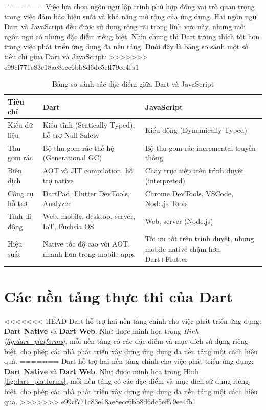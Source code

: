 \documentclass[../DoAn.tex]{subfiles}
\numberwithin{figure}{chapter}
\begin{document}
\begin{itemize}
\begin{itemize}
=======
Việc lựa chọn ngôn ngữ lập trình phù hợp đóng vai trò quan trọng trong việc đảm bảo hiệu suất và khả năng mở rộng của ứng dụng. Hai ngôn ngữ Dart và JavaScript đều được sử dụng rộng rãi trong lĩnh vực này, nhưng mỗi ngôn ngữ có những đặc điểm riêng biệt. Nhìn chung thì Dart tương thích tốt hơn trong việc phát triển ứng dụng đa nền tảng. Dưới đây là bảng so sánh một số tiêu chí giữa Dart và JavaScript:
>>>>>>> e99cf771c83e18ae8ecc6bb8d6dc5eff79ee4fb1
\begin{table}[H]
\centering
\begin{tabular}{|>{\centering\arraybackslash}p{4.5cm}|>{\centering\arraybackslash}p{4.5cm}|>{\centering\arraybackslash}p{4.5cm}|}
\hline
\textbf{Tiêu chí} & \textbf{Dart} & \textbf{JavaScript} \\ \hline
Kiểu dữ liệu & Kiểu tĩnh (Statically Typed), hỗ trợ Null Safety & Kiểu động (Dynamically Typed) \\ \hline
Thu gom rác & Bộ thu gom rác thế hệ (Generational GC) & Bộ thu gom rác incremental truyền thống \\ \hline
Biên dịch & AOT và JIT compilation, hỗ trợ native & Chạy trực tiếp trên trình duyệt (interpreted) \\ \hline
Công cụ hỗ trợ & DartPad, Flutter DevTools, Analyzer & Chrome DevTools, VSCode, Node.js Tools \\ \hline
Tính di động & Web, mobile, desktop, server, IoT, Fuchsia OS & Web, server (Node.js) \\ \hline
Hiệu suất & Native tốc độ cao với AOT, nhanh hơn trong mobile apps & Tối ưu tốt trên trình duyệt, nhưng mobile native chậm hơn Dart+Flutter \\ \hline
\end{tabular}
\caption{Bảng so sánh các đặc điểm giữa Dart và JavaScript}
\label{tab:dart_vs_js}
\end{table}

\section{Các nền tảng thực thi của Dart}

<<<<<<< HEAD
Dart hỗ trợ hai nền tảng chính cho việc phát triển ứng dụng: \textbf{Dart Native} và \textbf{Dart Web}. Như được minh họa trong \textit{Hình \ref{fig:dart_platforms}}, mỗi nền tảng có các đặc điểm và mục đích sử dụng riêng biệt, cho phép các nhà phát triển xây dựng ứng dụng đa nền tảng một cách hiệu quả.
=======
Dart hỗ trợ hai nền tảng chính cho việc phát triển ứng dụng: \textbf{Dart Native} và \textbf{Dart Web}. Như được minh họa trong Hình \ref{fig:dart_platforms}, mỗi nền tảng có các đặc điểm và mục đích sử dụng riêng biệt, cho phép các nhà phát triển xây dựng ứng dụng đa nền tảng một cách hiệu quả.
>>>>>>> e99cf771c83e18ae8ecc6bb8d6dc5eff79ee4fb1


\end{itemize}
\end{itemize}
\end{document}
